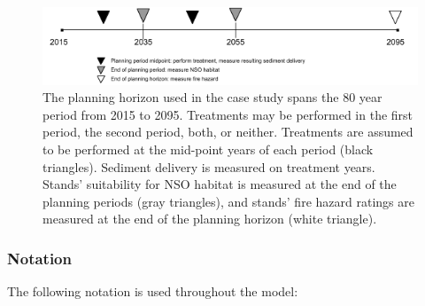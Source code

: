 \begin{figure}
\centering
\includegraphics[width=.85\textwidth]{../images/Drink_PlanningHorizon_Sketch}
\caption[Planning horizon for the case study]{The planning horizon used in the case study spans the 80 year period from 2015 to 2095. Treatments may be performed in the first period, the second period, both, or neither. Treatments are assumed to be performed at the mid-point years of each period (black triangles). Sediment delivery is measured on treatment years. Stands' suitability for NSO habitat is measured at the end of the planning periods (gray triangles), and stands' fire hazard ratings are measured at the end of the planning horizon (white triangle).}
\label{fig:drinkPlanningHorizon}
\end{figure}

\subsubsection{Notation}
The following notation is used throughout the model:
